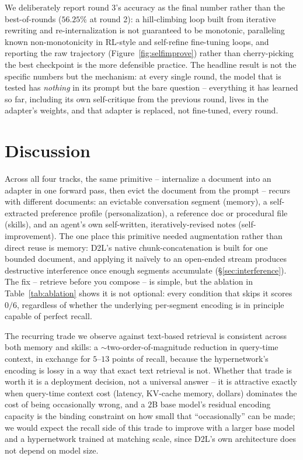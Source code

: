 \documentclass[11pt]{article}
\newcommand{\DTL}{D2L}
\begin{document}
We deliberately report round 3's accuracy as the final number rather than the best-of-rounds ($56.25\%$ at round 2): a hill-climbing loop built from iterative rewriting and re-internalization is not guaranteed to be monotonic, paralleling known non-monotonicity in RL-style and self-refine fine-tuning loops, and reporting the raw trajectory (Figure~\ref{fig:selfimprove}) rather than cherry-picking the best checkpoint is the more defensible practice. The headline result is not the specific numbers but the mechanism: at every single round, the model that is tested has \emph{nothing} in its prompt but the bare question -- everything it has learned so far, including its own self-critique from the previous round, lives in the adapter's weights, and that adapter is replaced, not fine-tuned, every round.

\section{Discussion}

Across all four tracks, the same primitive -- internalize a document into an adapter in one forward pass, then evict the document from the prompt -- recurs with different documents: an evictable conversation segment (memory), a self-extracted preference profile (personalization), a reference doc or procedural file (skills), and an agent's own self-written, iteratively-revised notes (self-improvement). The one place this primitive needed augmentation rather than direct reuse is memory: \DTL{}'s native chunk-concatenation is built for one bounded document, and applying it na\"ively to an open-ended stream produces destructive interference once enough segments accumulate (\S\ref{sec:interference}). The fix -- retrieve before you compose -- is simple, but the ablation in Table~\ref{tab:ablation} shows it is not optional: every condition that skips it scores $0/6$, regardless of whether the underlying per-segment encoding is in principle capable of perfect recall.

The recurring trade we observe against text-based retrieval is consistent across both memory and skills: a $\sim$two-order-of-magnitude reduction in query-time context, in exchange for $5$--$13$ points of recall, because the hypernetwork's encoding is lossy in a way that exact text retrieval is not. Whether that trade is worth it is a deployment decision, not a universal answer -- it is attractive exactly when query-time context cost (latency, KV-cache memory, dollars) dominates the cost of being occasionally wrong, and a $2$B base model's residual encoding capacity is the binding constraint on how small that ``occasionally'' can be made; we would expect the recall side of this trade to improve with a larger base model and a hypernetwork trained at matching scale, since \DTL{}'s own architecture does not depend on model size.
\end{document}
